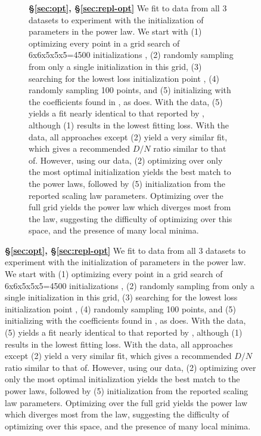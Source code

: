 \begin{figure}[]
\begin{subfigure}{\textwidth}
\caption{\textbf{\S\ref{sec:opt}, \S\ref{sec:repl-opt}} We fit to data from all 3 datasets to experiment with the initialization of parameters in the power law. We start with (1) optimizing every point in a grid search of 6x6x5x5x5=4500 initializations \citep{hoffmann2022training}, (2) randomly sampling from only a single initialization in this grid, (3) searching for the lowest loss initialization point \citep{caballero2022broken}, (4) randomly sampling 100 points, and (5) initializing with the coefficients found in \citet{hoffmann2022training}, as \citet{besiroglu2024chinchilla} does. With the \citet{besiroglu2024chinchilla} data, (5) yields a fit nearly identical to that reported by \citet{hoffmann2022training}, although (1) results in the lowest fitting loss. With the \citet{porian2024resolving} data, all approaches except (2) yield a very similar fit, which gives a recommended $D/N$ ratio similar to that of\citet{hoffmann2022training}. However, using our data, (2) optimizing over only the most optimal initialization yields the best match to the \citet{hoffmann2022training} power laws, followed by (5) initialization from the reported \citet{hoffmann2022training} scaling law parameters. Optimizing over the full grid yields the power law which diverges most from the \citet{hoffmann2022training} law, suggesting the difficulty of optimizing over this space, and the presence of many local minima.
}
\label{fig:analysis_init_app}
\end{subfigure}
\end{figure}

